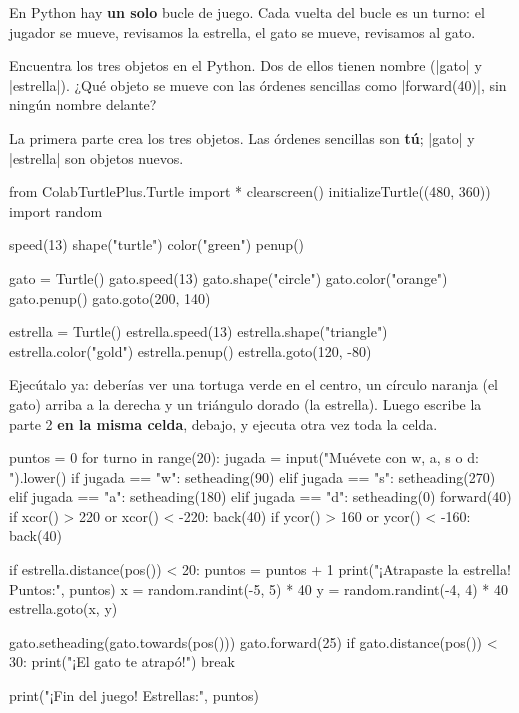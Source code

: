 En Python hay \textbf{un solo} bucle de juego. Cada vuelta del bucle es un turno: el jugador se mueve, revisamos la estrella, el gato se mueve, revisamos al gato.

\begin{think}
Encuentra los tres objetos en el Python. Dos de ellos tienen nombre (\py|gato| y \py|estrella|). ¿Qué objeto se mueve con las órdenes sencillas como \py|forward(40)|, sin ningún nombre delante?
\end{think}

La primera parte crea los tres objetos. Las órdenes sencillas son \textbf{tú}; \py|gato| y \py|estrella| son objetos nuevos.

\begin{typethis}
from ColabTurtlePlus.Turtle import *
clearscreen()
initializeTurtle((480, 360))
import random

speed(13)
shape("turtle")
color("green")
penup()

gato = Turtle()
gato.speed(13)
gato.shape("circle")
gato.color("orange")
gato.penup()
gato.goto(200, 140)

estrella = Turtle()
estrella.speed(13)
estrella.shape("triangle")
estrella.color("gold")
estrella.penup()
estrella.goto(120, -80)
\end{typethis}

Ejecútalo ya: deberías ver una tortuga verde en el centro, un círculo naranja (el gato) arriba a la derecha y un triángulo dorado (la estrella). Luego escribe la parte 2 \textbf{en la misma celda}, debajo, y ejecuta otra vez toda la celda.

\lstset{firstnumber=25}
\begin{typethis}
puntos = 0
for turno in range(20):
    jugada = input("Muévete con w, a, s o d: ").lower()
    if jugada == "w":
        setheading(90)
    elif jugada == "s":
        setheading(270)
    elif jugada == "a":
        setheading(180)
    elif jugada == "d":
        setheading(0)
    forward(40)
    if xcor() > 220 or xcor() < -220:
        back(40)
    if ycor() > 160 or ycor() < -160:
        back(40)

    if estrella.distance(pos()) < 20:
        puntos = puntos + 1
        print("¡Atrapaste la estrella! Puntos:", puntos)
        x = random.randint(-5, 5) * 40
        y = random.randint(-4, 4) * 40
        estrella.goto(x, y)

    gato.setheading(gato.towards(pos()))
    gato.forward(25)
    if gato.distance(pos()) < 30:
        print("¡El gato te atrapó!")
        break

print("¡Fin del juego! Estrellas:", puntos)
\end{typethis}
\lstset{firstnumber=1}

